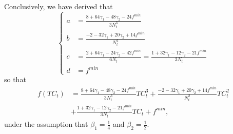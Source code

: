 \documentclass[12pt]{article}
\begin{document}
\begin{appendices}
		Conclusively, we have derived that
        \begin{equation} \label{eq:cubic_a_b_c}
		    \begin{cases}
		        a &= \frac{8 + 64\gamma_1 - 48\gamma_2 -24f^{min}}{3N_t^3} \\
		        b &= \frac{-2 - 32\gamma_1 + 20\gamma_2 + 14f^{min}}{N_t^2} \\
		        c &= \frac{2 + 64\gamma_1 - 24\gamma_2 - 42f^{min}}{6N_t} = \frac{1 + 32\gamma_1 - 12\gamma_2 - 21f^{min}}{3N_t} \\
		        d &= f^{min}
		    \end{cases}
		\end{equation}
		so that
		\begin{align*}
		f(TC_t) &= \frac{8 + 64\gamma_1 - 48\gamma_2 -24f^{min}}{3N_t^3}TC_t^3 + \frac{-2 - 32\gamma_1 + 20\gamma_2 + 14f^{min}}{N_t^2}TC_t^2 \\
		&+ \frac{1 + 32\gamma_1 - 12\gamma_2 - 21f^{min}}{3N_t}TC_t + f^{min},
		\end{align*}
		under the assumption that $\beta_1 = \frac{1}{4}$ and $\beta_2 = \frac{1}{2}$.
	
	\end{appendices}
	
\end{document}
